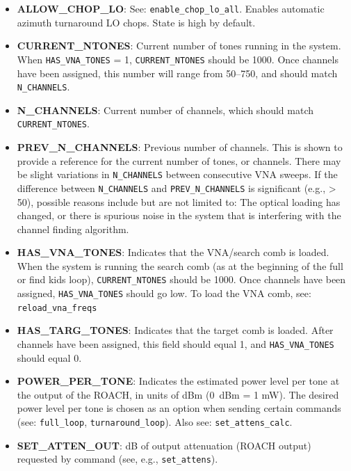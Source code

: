 \begin{itemize}[leftmargin=*,label={}]
\item \textbf{ALLOW\_CHOP\_LO}: See: \texttt{enable\_chop\_lo\_all}. Enables automatic azimuth turnaround LO chops. State is high by default.

\item \textbf{CURRENT\_NTONES}: Current number of tones running in the system. When \texttt{HAS\_VNA\_TONES} = 1, \texttt{CURRENT\_NTONES} should be 1000. Once channels have been assigned, this number will range from 50--750, and should match \texttt{N\_CHANNELS}.

\item \textbf{N\_CHANNELS}: Current number of channels, which should match \texttt{CURRENT\_NTONES}.

\item \textbf{PREV\_N\_CHANNELS}: Previous number of channels. This is shown to provide a reference for the current number of tones, or channels. There may be slight variations in \texttt{N\_CHANNELS} between consecutive VNA sweeps. If the difference between \texttt{N\_CHANNELS} and \texttt{PREV\_N\_CHANNELS} is significant (e.g., > 50), possible reasons include but are not limited to: The optical loading has changed, or there is spurious noise in the system that is interfering with the channel finding algorithm.

\item \textbf{HAS\_VNA\_TONES}: Indicates that the VNA/search comb is loaded. When the system is running the search comb (as at the beginning of the full or find kids loop), \texttt{CURRENT\_NTONES} should be 1000. Once channels have been assigned, \texttt{HAS\_VNA\_TONES} should go low. To load the VNA comb, see: \texttt{reload\_vna\_freqs}

\item \textbf{HAS\_TARG\_TONES}: Indicates that the target comb is loaded. After channels have been assigned, this field should equal 1, and \texttt{HAS\_VNA\_TONES} should equal 0.

\item \textbf{POWER\_PER\_TONE}: Indicates the estimated power level per tone at the output of the ROACH, in units of dBm (0~dBm = 1 mW). The desired power level per tone is chosen as an option when sending certain commands (see: \texttt{full\_loop}, \texttt{turnaround\_loop}). Also see: \texttt{set\_attens\_calc}.

\item \textbf{SET\_ATTEN\_OUT}: dB of output attenuation (ROACH output) requested by command (see, e.g., \texttt{set\_attens}).


\end{itemize}
